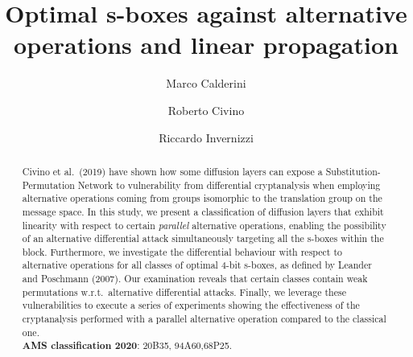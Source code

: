 \documentclass[runningheads,a4paper,english]{llncs}
\begin{document}
\title{Optimal s-boxes against alternative operations and linear propagation}

%
%
\author{Marco Calderini \and
Roberto Civino \and
Riccardo Invernizzi}

%
%

\maketitle

\begin{abstract}
Civino et al.~(2019) have shown how some diffusion layers can expose a Substitution-Permutation Network
to vulnerability from differential cryptanalysis when employing alternative operations coming from groups isomorphic to the translation group on the message space. In this study, we present a classification of diffusion layers that exhibit linearity with respect to certain \emph{parallel} alternative operations, enabling the possibility of an alternative differential attack simultaneously targeting all the s-boxes within the block.
Furthermore, we investigate the differential behaviour with respect to alternative operations for all classes of optimal 4-bit s-boxes, as defined by Leander and Poschmann (2007). Our examination reveals that certain classes contain weak permutations w.r.t.\ alternative differential attacks. 
Finally, we leverage these vulnerabilities to execute a series of experiments showing the effectiveness of the cryptanalysis performed with a parallel alternative operation compared to the classical one.\\

\textbf{AMS classification 2020}: 20B35, 94A60,68P25.

\end{abstract}
\end{document}

